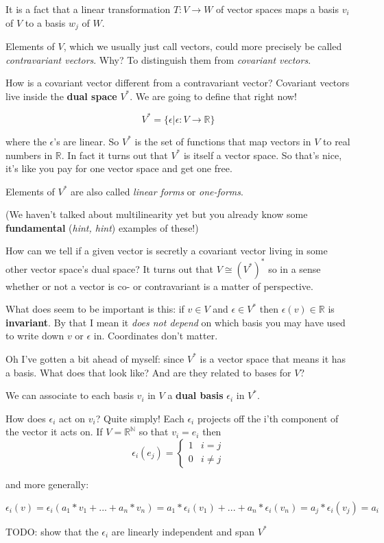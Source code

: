\documentclass{article}
\begin{document}
It is a fact that a linear transformation $T : V \to W$ of vector spaces maps a
basis $v_{i}$ of $V$ to a basis $w_{j}$ of $W$.

Elements of $V$, which we usually just call vectors, could more precisely be
called \textsl{contravariant vectors}. Why? To distinguish them from
\textsl{covariant vectors}.

How is a covariant vector different from a contravariant vector? Covariant
vectors live inside the \textbf{dual space} $V^{*}$. We are going to define that
right now!

\[ V^{*} = \{ \epsilon | \epsilon : V \to \mathbb{R} \} \]

where the $\epsilon$'s are linear. So $V^{*}$ is the set of functions that map
vectors in $V$ to real numbers in $\mathbb{R}$. In fact it turns out that
$V^{*}$ is itself a vector space. So that's nice, it's like you pay for one
vector space and get one free.

Elements of $V^{*}$ are also called \textsl{linear forms} or \textsl{one-forms}.

(We haven't talked about multilinearity yet but you already know some
\textbf{fundamental} (\textsl{hint, hint}) examples of these!)

How can we tell if a given vector is secretly a covariant vector living in some
other vector space's dual space? It turns out that $V \cong (V^{*})^{*}$ so in a
sense whether or not a vector is co- or contravariant is a matter of
perspective.

What does seem to be important is this: if $v \in V$ and $\epsilon \in V^{*}$
then $\epsilon(v) \in \mathbb{R}$ is \textbf{invariant}. By that I mean it
\textsl{does not depend} on which basis you may have used to write down $v$ or
$\epsilon$ in. Coordinates don't matter.

Oh I've gotten a bit ahead of myself: since $V^{*}$ is a vector space that means
it has a basis. What does that look like? And are they related to bases for $V$?

We can associate to each basis $v_{i}$ in $V$ a \textbf{dual basis}
$\epsilon_{i}$ in $V^{*}$.

How does $\epsilon_{i}$ act on $v_{i}$? Quite simply! Each $\epsilon_{i}$
projects off the i'th component of the vector it acts on. If $V =
\mathbb{R^{N}}$ so that $v_{i} = e_{i}$ then
\begin{equation*}
  \epsilon_{i}(e_{j}) = \begin{cases}
    1 & i = j\\
    0 & i \neq j
  \end{cases}
\end{equation*}

and more generally:

\begin{equation*}
  \epsilon_{i}(v) = \epsilon_{i}(a_{1} * v_{1} + ... + a_{n} * v_{n}) = a_{1} * \epsilon_{i}(v_{1}) + ... + a_{n} * \epsilon_{i}(v_{n}) = a_{j} * \epsilon_{i}(v_{j}) = a_{i}
\end{equation*}

TODO: show that the $\epsilon_{i}$ are linearly independent and span $V^{*}$
\end{document}
